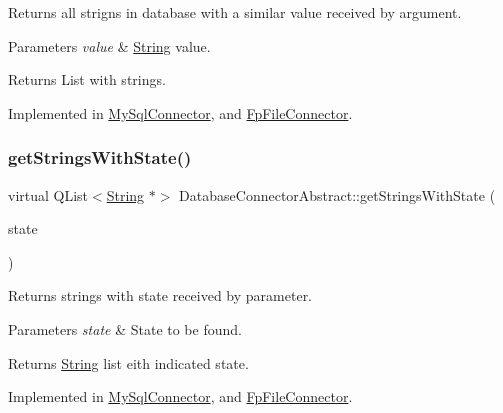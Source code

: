Returns all strigns in database with a similar value received by argument. 


\begin{DoxyParams}{Parameters}
{\em value} & \mbox{\hyperlink{classString}{String}} value. \\
\hline
\end{DoxyParams}
\begin{DoxyReturn}{Returns}
List with strings. 
\end{DoxyReturn}


Implemented in \mbox{\hyperlink{classMySqlConnector_a8a480141c72dc8da687b15f921ab1a4e}{My\+Sql\+Connector}}, and \mbox{\hyperlink{classFpFileConnector_adc85e526e1dab9f3de03cb8a2f33f7d1}{Fp\+File\+Connector}}.

\mbox{\label{classDatabaseConnectorAbstract_a74952c7e14c891e33c84995066003c5a}} 
\subsubsection{\texorpdfstring{get\+Strings\+With\+State()}{getStringsWithState()}}
{\footnotesize\ttfamily virtual Q\+List$<$\mbox{\hyperlink{classString}{String}} $\ast$$>$ Database\+Connector\+Abstract\+::get\+Strings\+With\+State (\begin{DoxyParamCaption}\item[{const Q\+String}]{state }\end{DoxyParamCaption})\hspace{0.3cm}{\ttfamily [pure virtual]}}



Returns strings with state received by parameter. 


\begin{DoxyParams}{Parameters}
{\em state} & State to be found. \\
\hline
\end{DoxyParams}
\begin{DoxyReturn}{Returns}
\mbox{\hyperlink{classString}{String}} list eith indicated state. 
\end{DoxyReturn}


Implemented in \mbox{\hyperlink{classMySqlConnector_a821c3dcebcd763df1700881cb47685d5}{My\+Sql\+Connector}}, and \mbox{\hyperlink{classFpFileConnector_a4c671329fd2fd1b9c3a7d72de1028afd}{Fp\+File\+Connector}}.


